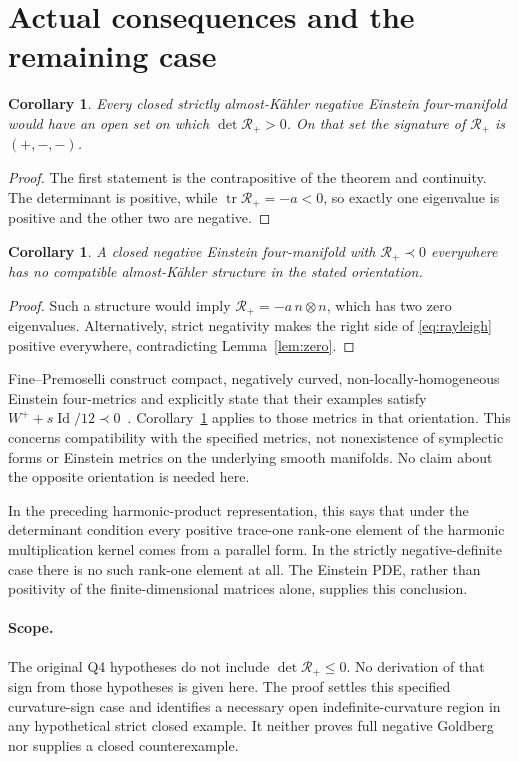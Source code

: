 \documentclass[11pt]{article}
\newtheorem{corollary}[theorem]{Corollary}
\theoremstyle{remark}\newtheorem{remark}[theorem]{Remark}
\newcommand{\tr}{\operatorname{tr}}
\newcommand{\Id}{\operatorname{Id}}
\newcommand{\RR}{\mathcal R_+}
\begin{document}
\section{Actual consequences and the remaining case}
\begin{corollary}\label{cor:positive}
Every closed strictly almost-K\"ahler negative Einstein four-manifold would
have an open set on which $\det\RR>0$. On that set the signature of
$\RR$ is $(+,-,-)$.
\end{corollary}
\begin{proof}
The first statement is the contrapositive of the theorem and continuity.
The determinant is positive, while $\tr\RR=-a<0$, so exactly one eigenvalue
is positive and the other two are negative.
\end{proof}

\begin{corollary}\label{cor:definite}
A closed negative Einstein four-manifold with $\RR\prec0$ everywhere has
no compatible almost-K\"ahler structure in the stated orientation.
\end{corollary}
\begin{proof}
Such a structure would imply $\RR=-a\,n\otimes n$, which has two zero
eigenvalues. Alternatively, strict negativity makes the right side of
\eqref{eq:rayleigh} positive everywhere, contradicting Lemma~\ref{lem:zero}.
\end{proof}

Fine--Premoselli construct compact, negatively curved, non-locally-homogeneous
Einstein four-metrics and explicitly state that their examples satisfy
$W^++s\Id/12\prec0$~\cite[Theorem 1.2 and following discussion]{FP}.
Corollary~\ref{cor:definite} applies to those metrics in that orientation.
This concerns compatibility with the specified metrics, not nonexistence
of symplectic forms or Einstein metrics on the underlying smooth manifolds.
No claim about the opposite orientation is needed here.

In the preceding harmonic-product representation, this says that under the
determinant condition every positive trace-one rank-one element of the
harmonic multiplication kernel comes from a parallel form. In the strictly
negative-definite case there is no such rank-one element at all. The
Einstein PDE, rather than positivity of the finite-dimensional matrices
alone, supplies this conclusion.

\paragraph{Scope.}
The original Q4 hypotheses do not include $\det\RR\le0$. No derivation of
that sign from those hypotheses is given here. The proof settles this
specified curvature-sign case and identifies a necessary open
indefinite-curvature region in any hypothetical strict closed example.
It neither proves full negative Goldberg nor supplies a closed counterexample.
\end{document}
